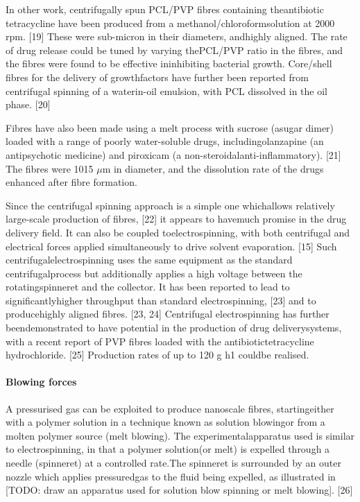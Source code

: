 \documentclass[5p,,preprint,12pt,twocolumn]{elsarticle}
\begin{document}
In other work, centrifugally spun PCL/PVP fibres containing theantibiotic tetracycline have been produced from a methanol/chloroformsolution at 2000 rpm. [19] These were sub-micron in their diameters, andhighly aligned. The rate of drug release could be tuned by varying thePCL/PVP ratio in the fibres, and the fibres were found to be effective ininhibiting bacterial growth. Core/shell fibres for the delivery of growthfactors have further been reported from centrifugal spinning of a waterin-oil emulsion, with PCL dissolved in the oil phase. [20]

Fibres have also been made using a melt process with sucrose (asugar dimer) loaded with a range of poorly water-soluble drugs, includingolanzapine (an antipsychotic medicine) and piroxicam (a non-steroidalanti-inflammatory). [21] The fibres were 10{\textendash}15 \ensuremath{\mu }m in diameter, and the dissolution rate of the drugs enhanced after fibre formation.

Since the centrifugal spinning approach is a simple one whichallows relatively large-scale production of fibres, [22] it appears to havemuch promise in the drug delivery field. It can also be coupled toelectrospinning, with both centrifugal and electrical forces applied simultaneously to drive solvent evaporation. [15] Such centrifugalelectrospinning uses the same equipment as the standard centrifugalprocess but additionally applies a high voltage between the rotatingspinneret and the collector. It has been reported to lead to significantlyhigher throughput than standard electrospinning, [23] and to producehighly aligned fibres. [23, 24] Centrifugal electrospinning has further beendemonstrated to have potential in the production of drug deliverysystems, with a recent report of PVP fibres loaded with the antibiotictetracycline hydrochloride. [25] Production rates of up to 120 g h{\textendash}1 couldbe realised.



\paragraph{Blowing forces}A pressurised gas can be exploited to produce nanoscale fibres, startingeither with a polymer solution in a technique known as solution blowingor from a molten polymer source (melt blowing). The experimentalapparatus used is similar to electrospinning, in that a polymer solution(or melt) is expelled through a needle (spinneret) at a controlled rate.The spinneret is surrounded by an outer nozzle which applies pressuredgas to the fluid being expelled, as illustrated in [TODO: draw an apparatus used for solution blow spinning or melt blowing]. [26]
\end{document}
